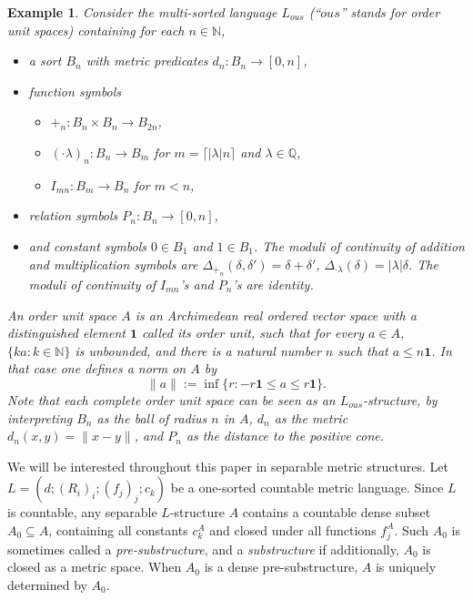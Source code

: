 \documentclass[12pt]{amsart}
\newtheorem{example}[theorem]{Example}
\begin{document}
\begin{example} \label{example:language Lous}
    Consider the multi-sorted language $L_{ous}$ (``$ous$'' stands for order unit spaces) containing for each $n\in\mathbb N$,
    \begin{itemize}
        \item a sort $B_n$ with metric predicates $d_n \colon B_n\to[0,n]$,
        \item function symbols 
        \begin{itemize}
            \item $+_n \colon B_n\times B_n\to B_{2n}$, 
            \item $(\cdot\lambda)_n \colon B_n\to B_m$ for $m={\lceil |\lambda| n \rceil}$ and $\lambda\in\mathbb Q$,
            \item $I_{mn} \colon B_m\to B_n$ for $m<n$,
        \end{itemize}
        \item relation symbols $P_n \colon B_n \to [0,n]$,
        \item and constant symbols $0\in B_1$ and $1\in B_1$.
        The moduli of continuity of addition and multiplication symbols are $\Delta_{+_n}(\delta,\delta')=\delta+\delta'$, $\Delta_{\cdot\lambda}(\delta)=|\lambda|\delta$. The moduli of continuity of $I_{mn}$'s and $P_n$'s are identity.
    \end{itemize}
    An order unit space $A$ is an Archimedean real ordered vector space with a distinguished element $\mathbf{1}$ called its order unit, such that for every $a \in A$, $\{k a \colon k \in \mathbb{N} \}$ is unbounded, and there is a natural number $n$ such that $a \leq n \mathbf{1}$. In that case one defines a norm on $A$ by
    \[ \|a \| := \inf \{r \colon -r\mathbf{1} \leq a \leq r \mathbf{1}  \}. \]
    Note that each complete order unit space can be seen as an $L_{ous}$-structure, by interpreting $B_n$ as the ball of radius $n$ in $A$, $d_n$ as the metric $d_n(x,y) = \|x-y\|$, and $P_n$ as the distance to the positive cone.
\end{example}


We will be interested throughout this paper in separable metric structures. Let ${L}=(d;(R_i)_i;(f_j)_j;c_k)$ be a one-sorted countable metric language. Since $L$ is countable, any separable $L$-structure $A$ contains a countable dense subset $A_0\subseteq A$, containing all constants $c_k^A$ and closed under all functions $f_j^A$. Such $A_0$ is sometimes called a \emph{pre-substructure}, and a \emph{substructure} if additionally, $A_0$ is closed as a metric space. When $A_0$ is a dense pre-substructure, $A$ is uniquely determined by $A_0$.
\end{document}
